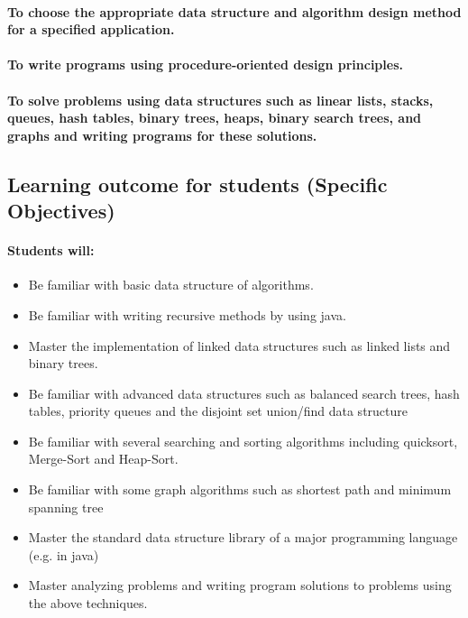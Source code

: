 \documentclass{article}
\begin{document}
\paragraph{To choose the appropriate data structure and algorithm design method for a specified application. }
\paragraph{To write programs using procedure-oriented design principles.}
\paragraph{To solve problems using data structures such as linear lists, stacks, queues, hash tables, binary trees, heaps, binary search trees, and graphs and writing programs for these solutions\cite{aho1974design}.}
\subsection{Learning outcome for students (Specific Objectives)}
\paragraph{Students will:}

\begin{itemize}
    \item Be familiar with basic data structure of algorithms.  

    \item Be familiar with writing recursive methods by using java.

    \item Master the implementation of linked data structures such as linked lists and binary trees.  

    \item Be familiar with advanced data structures such as balanced search trees, hash tables, priority queues and the disjoint set union/find data structure  
    \item Be familiar with several searching and sorting algorithms including quicksort, Merge-Sort and Heap-Sort\cite{cook1980best}.  

    \item Be familiar with some graph algorithms such as shortest path and minimum spanning tree 
    \item Master the standard data structure library of a major programming language (e.g. in java) 
    \item Master analyzing problems and writing program solutions to problems using the  above techniques.

\end{itemize}
\end{document}
